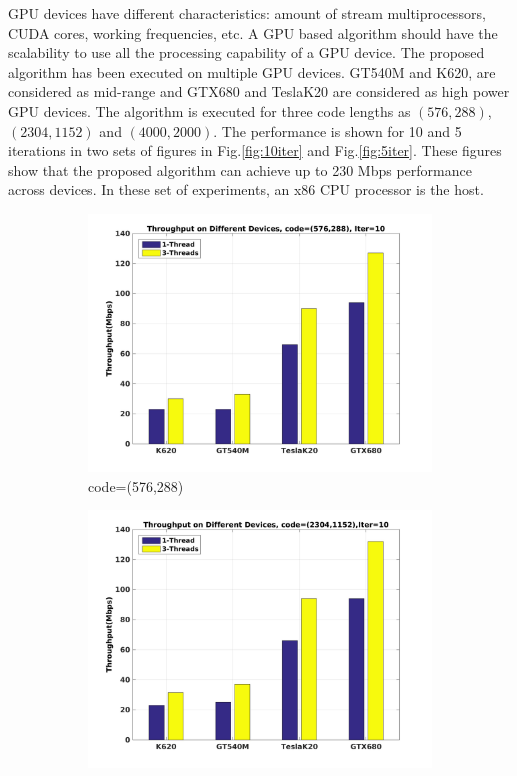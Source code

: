 \documentclass[10pt,a4paper]{article}
\begin{document}
GPU devices have different characteristics: amount of stream multiprocessors, CUDA cores, working frequencies, etc. A GPU based algorithm should have the scalability to use all the processing capability of a GPU device. The proposed algorithm has been executed on multiple GPU devices. GT540M and K620, are considered as mid-range and GTX680 and TeslaK20 are considered as high power GPU devices. The algorithm is executed for three code lengths as $(576,288)$, $(2304,1152)$ and $(4000,2000)$. The performance is shown for 10 and 5 iterations in two sets of figures in Fig.\ref{fig:10iter} and Fig.\ref{fig:5iter}. These figures show that the proposed algorithm can achieve up to 230 Mbps performance across devices. In these set of experiments, an x86 CPU processor is the host.
\noindent
\begin{figure}[H]
  \begin{subfigure}[b]{0.6\textwidth}
    \includegraphics[width=\textwidth]{c_576_10.jpg}
    \caption{code=(576,288)}
    \label{fig:throu_10_a}
  \end{subfigure}
  \begin{subfigure}[b]{0.6\textwidth}
    \includegraphics[width=\textwidth]{c_2304_10.jpg}

\end{subfigure}
\end{figure}
\end{document}
